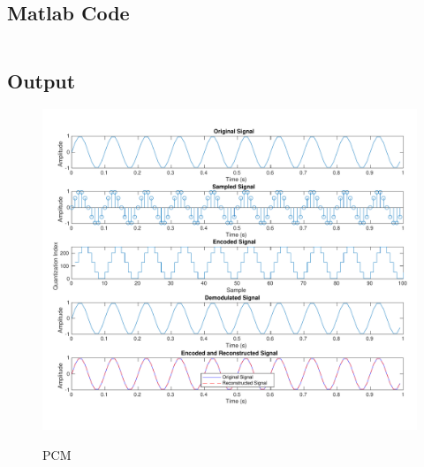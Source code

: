 \subsection{Matlab Code}

\inputminted[fontsize=\footnotesize,autogobble]{matlab}{code/pcm.m}

\pagebreak
\subsection{Output}

\begin{figure}[!htb]
      \centering
      \includegraphics[width=\textwidth]{res/figures/pcm_no_quantization.pdf}
      \label{output:pcm}
      \caption{PCM}
\end{figure}

